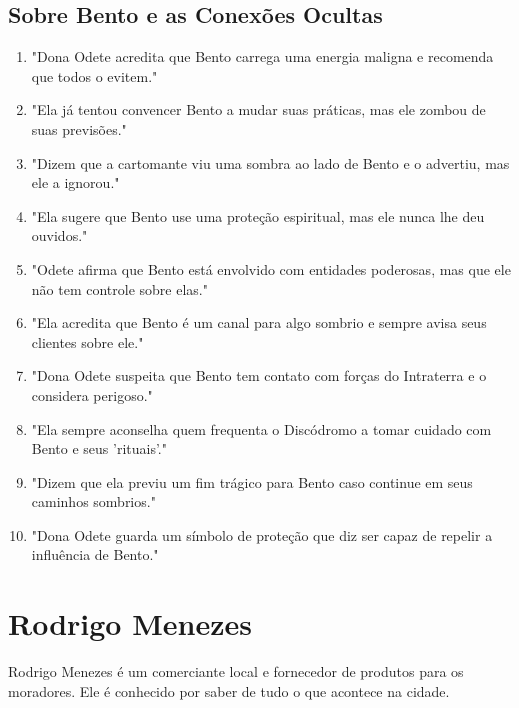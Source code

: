 \subsection*{Sobre Bento e as Conexões Ocultas}
\begin{enumerate}
    \item "Dona Odete acredita que Bento carrega uma energia maligna e recomenda que todos o evitem."
    \item "Ela já tentou convencer Bento a mudar suas práticas, mas ele zombou de suas previsões."
    \item "Dizem que a cartomante viu uma sombra ao lado de Bento e o advertiu, mas ele a ignorou."
    \item "Ela sugere que Bento use uma proteção espiritual, mas ele nunca lhe deu ouvidos."
    \item "Odete afirma que Bento está envolvido com entidades poderosas, mas que ele não tem controle sobre elas."
    \item "Ela acredita que Bento é um canal para algo sombrio e sempre avisa seus clientes sobre ele."
    \item "Dona Odete suspeita que Bento tem contato com forças do Intraterra e o considera perigoso."
    \item "Ela sempre aconselha quem frequenta o Discódromo a tomar cuidado com Bento e seus 'rituais'."
    \item "Dizem que ela previu um fim trágico para Bento caso continue em seus caminhos sombrios."
    \item "Dona Odete guarda um símbolo de proteção que diz ser capaz de repelir a influência de Bento."
\end{enumerate}

\section{Rodrigo Menezes}
Rodrigo Menezes é um comerciante local e fornecedor de produtos para os moradores. Ele é conhecido por saber de tudo o que acontece na cidade.

